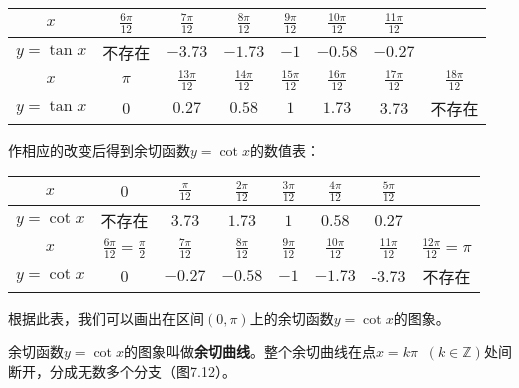 \begin{center}
\begin{tabular}{c|ccccccc}
\hline
$x$  &    $\frac{6\pi}{12}$  &    $\frac{7\pi}{12}$  &    $\frac{8\pi}{12}$  &    $\frac{9\pi}{12}$  &    $\frac{10\pi}{12}$  &    $\frac{11\pi}{12}$  \\    
\hline
$y=\tan x$   & 不存在  & $-3.73$  & $-1.73$  & $-1$  & $-0.58$  & $-0.27$  \\
\hline
$x$  &    $\pi$  &    $\frac{13\pi}{12}$  &    $\frac{14\pi}{12}$  &    $\frac{15\pi}{12}$  &    $\frac{16\pi}{12}$  &    $\frac{17\pi}{12}$ & $\frac{18\pi}{12}$ \\    
\hline
$y=\tan x$   & 0  & $0.27$  & $0.58$  & $1$  & $1.73$ & 3.73 & 不存在  \\
\hline
\end{tabular}    
\end{center}

作相应的改变后得到余切函数$y=\cot x$的数值表：
\begin{center}
\begin{tabular}{c|ccccccc}
\hline
$x$  &    $0$  &    $\frac{\pi}{12}$  &    $\frac{2\pi}{12}$  &    $\frac{3\pi}{12}$  &    $\frac{4\pi}{12}$  &    $\frac{5\pi}{12}$  \\    
\hline
$y=\cot x$   & 不存在  & $3.73$  & $1.73$  & $1$  & $0.58$  & $0.27$  \\
\hline
$x$  &    $\frac{6\pi}{12}=\frac{\pi}{2}$  &    $\frac{7\pi}{12}$  &    $\frac{8\pi}{12}$  &    $\frac{9\pi}{12}$  &    $\frac{10\pi}{12}$  &    $\frac{11\pi}{12}$ & $\frac{12\pi}{12}=\pi$ \\    
\hline
$y=\cot x$   & 0  & $-0.27$  & $-0.58$  & $-1$  & $-1.73$ & -3.73 & 不存在  \\
\hline
\end{tabular}    
\end{center}

根据此表，我们可以画出在区间$(0,\pi)$上的余切函数$y=\cot x$的图象。

余切函数$y=\cot x$的图象叫做\textbf{余切曲线}。整个余切曲线在点$x=k\pi\;\;(k\in\mathbb{Z})$处间断开，分成无数多个分支（图7.12）。

\begin{figure}[htp]
    \centering
{}
    \caption{}
\end{figure}

